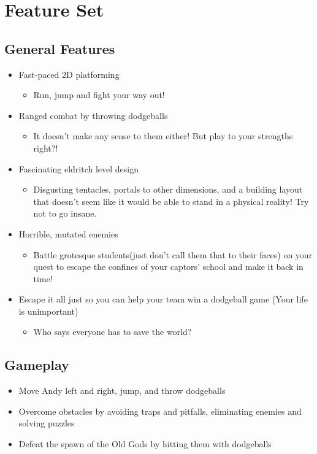 \documentclass [12pt]{article}
\begin{document}
\section*{Feature Set}

\subsection*{General Features}

\begin{itemize}
\item Fast-paced 2D platforming
	\begin{itemize}
	\item Run, jump and fight your way out!
	\end{itemize}
\item Ranged combat by throwing dodgeballs
	\begin{itemize}
	\item It doesn't make any sense to them either! But play to your strengths right?!
	\end{itemize}
\item Fascinating eldritch level design
	\begin{itemize}
	\item Disgusting tentacles, portals to other dimensions, and a building layout that doesn't seem like it would be able to stand in a physical reality! Try not to go insane.
	\end{itemize}
\item Horrible, mutated enemies
	\begin{itemize}
	\item Battle grotesque students(just don't call them that to their faces) on your quest to escape the confines of your captors' school and make it back in time!
	\end{itemize}
\item Escape it all just so you can help your team win a dodgeball game (Your life is unimportant)
	\begin{itemize}
	\item Who says everyone has to save the world?
	\end{itemize}
\end{itemize}

\subsection*{Gameplay}

\begin{itemize}
\item Move Andy left and right, jump, and throw dodgeballs
\item Overcome obstacles by avoiding traps and pitfalls, eliminating enemies and solving puzzles
\item Defeat the spawn of the Old Gods by hitting them with dodgeballs
\end{itemize}
\end{document}
